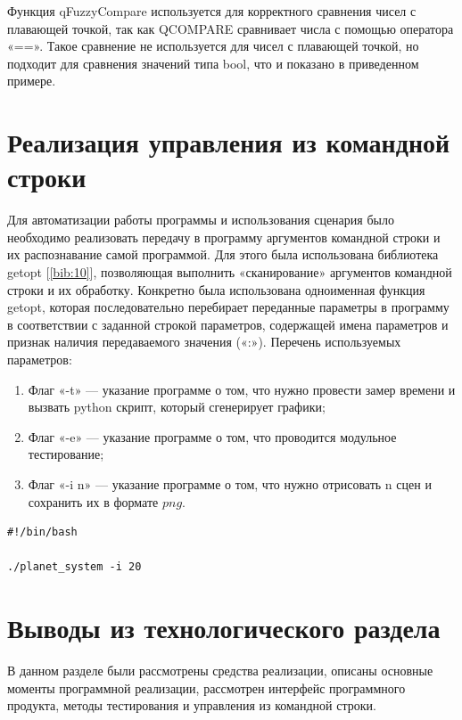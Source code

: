 \par Функция qFuzzyCompare используется для корректного сравнения чисел с 
плавающей точкой, так как QCOMPARE сравнивает числа с помощью оператора 
«==». Такое сравнение не используется для чисел с плавающей точкой, но 
подходит для сравнения значений типа bool, что и показано в приведенном 
примере.
\section{Реализация управления из командной строки}
\par Для автоматизации работы программы и использования сценария было 
необходимо реализовать передачу в программу аргументов командной строки и 
их распознавание самой программой. Для этого была использована библиотека 
getopt [\ref{bib:10}], позволяющая выполнить «сканирование» аргументов командной 
строки и их обработку. Конкретно была использована одноименная функция 
getopt, которая последовательно перебирает переданные параметры в программу 
в соответствии с заданной строкой параметров, содержащей имена параметров и 
признак наличия передаваемого значения («:»).
Перечень используемых параметров:
\begin{enumerate}
\item Флаг «-t» — указание программе о том, что нужно провести замер времени и вызвать python скрипт, который сгенерирует графики;
\item Флаг «-e» — указание программе о том, что проводится модульное тестирование;
\item Флаг «-i n» — указание программе о том, что нужно отрисовать n сцен и сохранить их в формате $png$.
\end{enumerate}
\begin{lstlisting}[label=some-code,caption= пример вызова программы для создания изображений ]
#!/bin/bash

./planet_system -i 20 
\end{lstlisting}

	\section{Выводы из технологического раздела}
	\par В данном разделе были рассмотрены средства реализации, описаны основные моменты программной реализации, рассмотрен интерфейс программного продукта, методы тестирования и управления из командной строки.
    	
\newpage